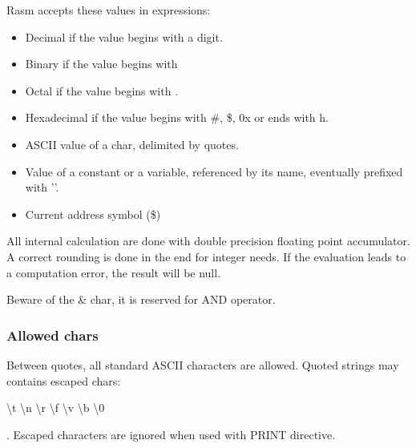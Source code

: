 \begin{xen}
Rasm accepts these values in expressions:
\begin{itemize}
  \item Decimal if the value begins with a digit.
  \item Binary if the value begins with %
  \item Octal if the value begins with \at.
  \item Hexadecimal if the value begins with \#, \$, 0x or ends with h.
  \item ASCII value of a char, delimited by quotes.
  \item Value of a constant or a variable, referenced by its name, eventually prefixed with '\at'.
  \item Current address symbol (\$)
\end{itemize}

All internal calculation are done with double precision floating point accumulator.
A correct rounding is done in the end for integer needs.
If the evaluation leads to a computation error, the result will be null.

Beware of the \& char, it is reserved for AND operator.

\subsubsection{Allowed chars}
Between quotes, all standard ASCII characters are allowed.
Quoted strings may contains escaped chars: \begin{ttfamily} \textbackslash t \textbackslash n  \textbackslash r \textbackslash f \textbackslash v \textbackslash b \textbackslash 0 \end{ttfamily}.
Escaped characters are ignored when used with PRINT directive.


\end{xen}

\subsection{}

